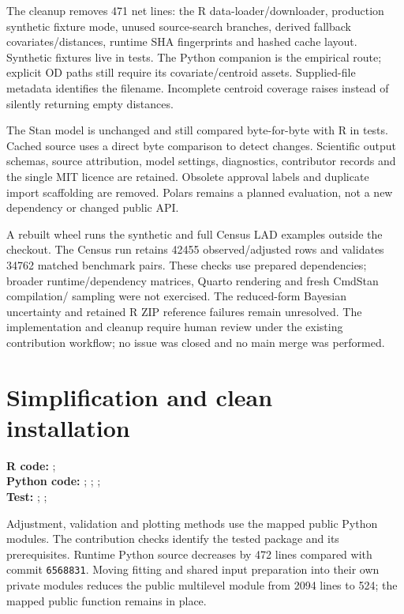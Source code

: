 \documentclass[10pt]{article}
\begin{document}
The cleanup removes 471 net lines: the R data-loader/downloader, production
synthetic fixture mode, unused source-search branches, derived fallback
covariates/distances, runtime SHA fingerprints and hashed cache layout.
Synthetic fixtures live in tests. The Python companion is the empirical route;
explicit OD paths still require its covariate/centroid assets. Supplied-file
metadata identifies the filename. Incomplete centroid coverage raises instead
of silently returning empty distances.

The Stan model is unchanged and still compared byte-for-byte with R in tests.
Cached source uses a direct byte comparison to detect changes. Scientific output
schemas, source attribution, model settings, diagnostics, contributor records
and the single MIT licence are retained. Obsolete approval labels and duplicate
import scaffolding are removed. Polars remains a planned evaluation, not a new
dependency or changed public API.

A rebuilt wheel runs the synthetic and full Census LAD examples outside the
checkout. The Census run retains 42455 observed/adjusted rows and validates
34762 matched benchmark pairs. These checks use prepared dependencies; broader
runtime/dependency matrices, Quarto rendering and fresh CmdStan compilation/
sampling were not exercised. The reduced-form Bayesian uncertainty and retained
R ZIP reference failures remain unresolved. The implementation and cleanup
require human review under the existing contribution workflow; no issue was
closed and no main merge was performed.

\clearpage
\section{Simplification and clean installation}
{\footnotesize \textbf{R code:} ; \\
\textbf{Python code:} ; ; ; \\
\textbf{Test:} ; ; \par}

Adjustment, validation and plotting methods use the mapped public Python modules.
The contribution checks identify the tested package and its prerequisites.
Runtime Python source decreases by 472 lines compared with commit \texttt{6568831}.
Moving fitting and shared input preparation into their own private modules reduces the
public multilevel module from 2094 lines to 524; the mapped public function remains in place.
\end{document}
